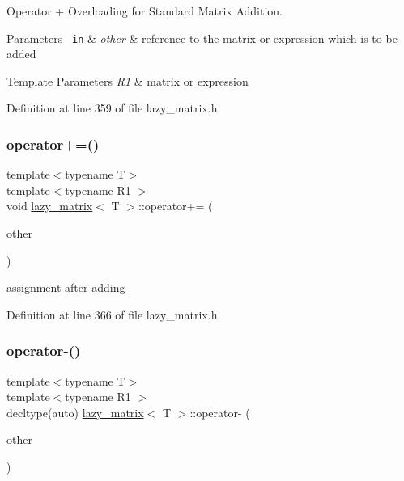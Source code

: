 Operator + Overloading for Standard Matrix Addition. 


\begin{DoxyParams}[1]{Parameters}
\mbox{\texttt{ in}}  & {\em other} & reference to the matrix or expression which is to be added\\
\hline
\end{DoxyParams}

\begin{DoxyTemplParams}{Template Parameters}
{\em R1} & matrix or expression \\
\hline
\end{DoxyTemplParams}


Definition at line 359 of file lazy\+\_\+matrix.\+h.

\mbox{\label{classlazy__matrix_ad095e5ee3870ca98a267961e260321ce}} 
\subsubsection{\texorpdfstring{operator+=()}{operator+=()}}
{\footnotesize\ttfamily template$<$typename T$>$ \\
template$<$typename R1 $>$ \\
void \mbox{\hyperlink{classlazy__matrix}{lazy\+\_\+matrix}}$<$ T $>$\+::operator+= (\begin{DoxyParamCaption}\item[{const R1 \&}]{other }\end{DoxyParamCaption})\hspace{0.3cm}{\ttfamily [inline]}}



assignment after adding 



Definition at line 366 of file lazy\+\_\+matrix.\+h.

\mbox{\label{classlazy__matrix_a04ef62e9f2c4395ad0a9e00a0180df9e}} 
\subsubsection{\texorpdfstring{operator-\/()}{operator-()}}
{\footnotesize\ttfamily template$<$typename T$>$ \\
template$<$typename R1 $>$ \\
decltype(auto) \mbox{\hyperlink{classlazy__matrix}{lazy\+\_\+matrix}}$<$ T $>$\+::operator-\/ (\begin{DoxyParamCaption}\item[{const R1 \&}]{other }\end{DoxyParamCaption})\hspace{0.3cm}{\ttfamily [inline]}}



